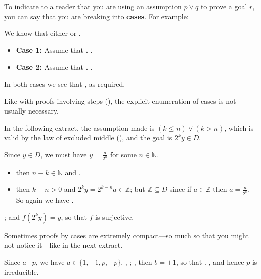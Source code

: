 \begin{vocabulary}
\label{vcbCases}
To indicate to a reader that you are using an assumption $p \vee q$ to prove a goal $r$, you can say that you are breaking into \textbf{cases}. For example:

\begin{vocabtemplate}
We know that either  or .
\begin{itemize}
\item \textbf{Case 1:} Assume that \textbf{.} .
\item \textbf{Case 2:} Assume that \textbf{.} .
\end{itemize}
In both cases we see that , as required.
\end{vocabtemplate}

Like with proofs involving steps (), the explicit enumeration of cases is not usually necessary.
\end{vocabulary}

In the following extract, the assumption made is $(k \le n) \vee (k > n)$, which is valid by the law of excluded middle (), and the goal is $2^ky \in D$.

\begin{extract}
\label{xtrCasesExample}
Since $y \in D$, we must have $y=\frac{a}{2^n}$ for some $n \in \mathbb{N}$.
\begin{itemize}
\item {} then $n-k \in \mathbb{N}$ and .
\item {} then $k-n>0$ and $2^ky = 2^{k-n}a \in \mathbb{Z}$; but $\mathbb{Z} \subseteq D$ since if $a \in \mathbb{Z}$ then $a=\frac{a}{2^0}$. So again we have .
\end{itemize}
; and $f(2^ky)=y$, so that $f$ is surjective.
\end{extract}

Sometimes proofs by cases are extremely compact---so much so that you might not notice it---like in the next extract.

\begin{extract}
\label{xtrCasesExampleThree}
Since $a \mid p$, we have $a \in \{ 1, -1, p, -p \}$. , ; , then $b = \pm 1$, so that . , and hence $p$ is irreducible.
\end{extract}

